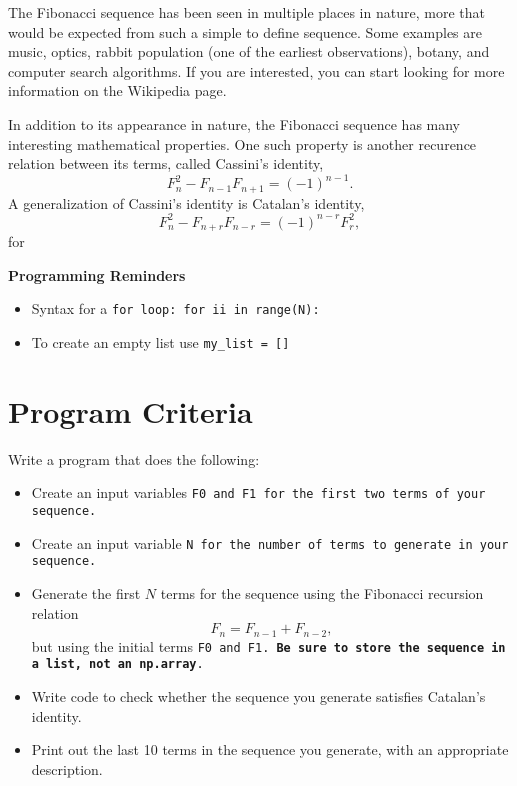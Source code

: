 \documentclass{article}
\def\prog#1{
\vspace{.1in}\begin{mdframed} \begin{center} \textbf{Programming Reminders} \end{center}#1 \end{mdframed} }
\begin{document}
	The Fibonacci sequence has been seen in multiple places in nature, more that would be expected from such a simple to define sequence.  Some examples are music, optics, rabbit population (one of the earliest observations), botany, and computer search algorithms.  If you are interested, you can start looking for more information on the Wikipedia page.
	
	In addition to its appearance in nature, the Fibonacci sequence has many interesting mathematical properties.  One such property is another recurence relation between its terms, called Cassini's identity,
	\[ F_n^2 - F_{n-1}F_{n+1} = (-1)^{n-1}.\]
	A generalization of Cassini's identity is Catalan's identity,
	\[F_n^2 - F_{n+r}F_{n-r} = (-1)^{n-r}F_r^2,\]
	for 
	
	
	
	
	
	
	
	\prog{
		\begin{itemize}
			\item Syntax for a \tt{for} loop: \tt{for ii in range(N):}
			\item To create an empty list use \tt{my\_list = []}
		\end{itemize}
		}




\section*{Program Criteria}
	Write a program that does the following:
	\begin{itemize}
		\item Create an input variables \tt{F0} and \tt{F1} for the first two terms of your sequence.
		\item Create an input variable \tt{N} for the number of terms to generate in your sequence.
		\item Generate the first $N$ terms for the sequence using the Fibonacci recursion relation
		\[ F_{n} = F_{n-1} + F_{n-2},\]
		but using the initial terms \tt{F0} and \tt{F1}.  \textbf{Be sure to store the sequence in a list, not an \tt{np.array}}.
		\item Write code to check whether the sequence you generate satisfies Catalan's identity.
		\item Print out the last 10 terms in the sequence you generate, with an appropriate description.
	\end{itemize}
\end{document}
